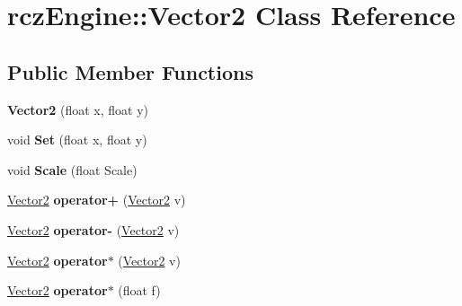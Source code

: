\hypertarget{classrcz_engine_1_1_vector2}{}\section{rcz\+Engine\+:\+:Vector2 Class Reference}
\label{classrcz_engine_1_1_vector2}
\subsection*{Public Member Functions}
\begin{DoxyCompactItemize}
\item 
\hypertarget{classrcz_engine_1_1_vector2_ac256f718c9200425267fab597adaffb8}{}{\bfseries Vector2} (float x, float y)\label{classrcz_engine_1_1_vector2_ac256f718c9200425267fab597adaffb8}

\item 
\hypertarget{classrcz_engine_1_1_vector2_abde7fee7e421b04bdadc91de14e4a620}{}void {\bfseries Set} (float x, float y)\label{classrcz_engine_1_1_vector2_abde7fee7e421b04bdadc91de14e4a620}

\item 
\hypertarget{classrcz_engine_1_1_vector2_a6e6b658feea407d926639fb82e2ee151}{}void {\bfseries Scale} (float Scale)\label{classrcz_engine_1_1_vector2_a6e6b658feea407d926639fb82e2ee151}

\item 
\hypertarget{classrcz_engine_1_1_vector2_aba760c9e0a8c1baac187944bd8feaf74}{}\hyperlink{classrcz_engine_1_1_vector2}{Vector2} {\bfseries operator+} (\hyperlink{classrcz_engine_1_1_vector2}{Vector2} v)\label{classrcz_engine_1_1_vector2_aba760c9e0a8c1baac187944bd8feaf74}

\item 
\hypertarget{classrcz_engine_1_1_vector2_a46fde837deadcc67481987ef2de39080}{}\hyperlink{classrcz_engine_1_1_vector2}{Vector2} {\bfseries operator-\/} (\hyperlink{classrcz_engine_1_1_vector2}{Vector2} v)\label{classrcz_engine_1_1_vector2_a46fde837deadcc67481987ef2de39080}

\item 
\hypertarget{classrcz_engine_1_1_vector2_a65ddb557846f25b68a2ee2e72d04db83}{}\hyperlink{classrcz_engine_1_1_vector2}{Vector2} {\bfseries operator$\ast$} (\hyperlink{classrcz_engine_1_1_vector2}{Vector2} v)\label{classrcz_engine_1_1_vector2_a65ddb557846f25b68a2ee2e72d04db83}

\item 
\hypertarget{classrcz_engine_1_1_vector2_ac5a3cd7feeae90c70f33ab6eb2491ae1}{}\hyperlink{classrcz_engine_1_1_vector2}{Vector2} {\bfseries operator$\ast$} (float f)\label{classrcz_engine_1_1_vector2_ac5a3cd7feeae90c70f33ab6eb2491ae1}


\end{DoxyCompactItemize}
